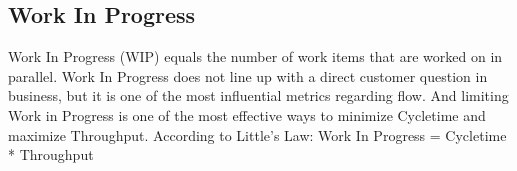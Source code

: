 \subsection{Work In Progress}
Work In Progress (WIP) equals the number of work items that are worked on in parallel. 
\newline
\newline
Work In Progress does not line up with a direct customer question in business, but it is one of the most influential metrics regarding flow. And limiting Work in Progress is one of the most effective ways to minimize \gls{Cycletime} and maximize Throughput.
\newline
\newline
According to Little's Law: Work In Progress = \gls{Cycletime} * Throughput
